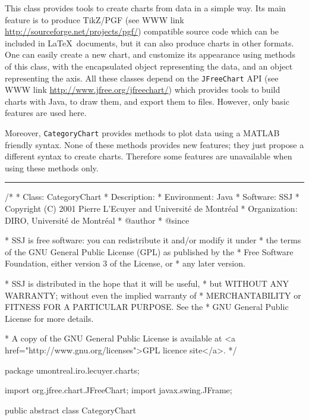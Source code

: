 
This class provides tools to create charts from data in a simple way. Its main
feature is to produce TikZ/PGF (see WWW link \url{http://sourceforge.net/projects/pgf/}) compatible source code which can be included
in \LaTeX\ documents, but it can also produce charts in other formats.
One can easily create a new chart, and customize its appearance using methods
of this class, with the encapsulated
 object
representing the data, and an 
object representing the axis.
All these classes depend on the \texttt{JFreeChart} API (see WWW link
\url{http://www.jfree.org/jfreechart/}) which provides tools to build charts with
Java, to draw them, and export them to files. However, only basic features are
used here.

Moreover, \texttt{CategoryChart} provides methods to plot data using a MATLAB friendly
syntax. None of these methods provides new features; they just propose a
different syntax to create charts. Therefore some features are unavailable
when using these methods only.

\bigskip\hrule
\begin{code}
\begin{hide}
/*
 * Class:        CategoryChart
 * Description:  
 * Environment:  Java
 * Software:     SSJ 
 * Copyright (C) 2001  Pierre L'Ecuyer and Université de Montréal
 * Organization: DIRO, Université de Montréal
 * @author       
 * @since

 * SSJ is free software: you can redistribute it and/or modify it under
 * the terms of the GNU General Public License (GPL) as published by the
 * Free Software Foundation, either version 3 of the License, or
 * any later version.

 * SSJ is distributed in the hope that it will be useful,
 * but WITHOUT ANY WARRANTY; without even the implied warranty of
 * MERCHANTABILITY or FITNESS FOR A PARTICULAR PURPOSE.  See the
 * GNU General Public License for more details.

 * A copy of the GNU General Public License is available at
   <a href="http://www.gnu.org/licenses">GPL licence site</a>.
 */
\end{hide}
package umontreal.iro.lecuyer.charts;\begin{hide}

import org.jfree.chart.JFreeChart;
import javax.swing.JFrame;\end{hide}

public abstract class CategoryChart \begin{hide} {

   protected Axis YAxis;
   protected SSJCategorySeriesCollection dataset;
   protected JFreeChart chart;
   protected boolean latexDocFlag = true;

   protected boolean autoRange;
   protected double[] manualRange;

   protected boolean grid = false;
   protected double ystepGrid;

   final protected double BOR = 0.1;\end{hide}
\end{code}


